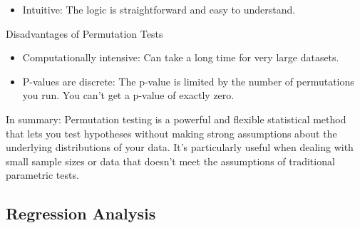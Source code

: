 \documentclass[11pt]{article}
\begin{document}
\begin{itemize}
\begin{itemize}
     \item Intuitive: The logic is straightforward and easy to understand.
\end{itemize}
Disadvantages of Permutation Tests
\begin{itemize}
 \item Computationally intensive: Can take a long time for very large datasets.
 \item P-values are discrete: The p-value is limited by the number of permutations you run. You can't get a p-value of exactly zero.
\end{itemize}
In summary: Permutation testing is a powerful and flexible statistical method that lets you test hypotheses without making strong assumptions about the underlying distributions of your data.  It's particularly useful when dealing with small sample sizes or data that doesn't meet the assumptions of traditional parametric tests.
\end{itemize}
\subsection{Regression Analysis}
\end{document}

